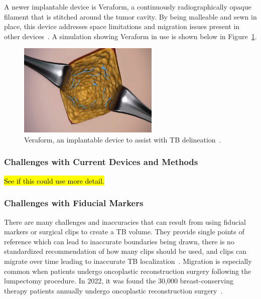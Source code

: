 A newer implantable device is Veraform, a continuously radiographically opaque filament that is stitched around the tumor cavity. By being malleable and sewn in place, this device addresses space limitations and migration issues present in other devices~\cite{RefWorks:RefID:344-mitchell2019adaptable}. A simulation showing Veraform in use is shown below in Figure~\ref{fig:introduction:veraform_implant}.
\begin{figure}[h!]
        \centering
        \includegraphics[width=0.6\textwidth]{../figs/introduction/veraform_implant.png}
        \caption{Veraform, an implantable device to assist with TB delineation~\cite{RefWorks:RefID:344-mitchell2019adaptable}.}
        \label{fig:introduction:veraform_implant}
\end{figure}

\subsubsection{Challenges with Current Devices and Methods\label{sec:introduction:motivation:challengeswithcurrentdevicesandmethods}}
\hl{See if this could use more detail.\\}

\subsubsection*{Challenges with Fiducial Markers\label{sec:introduction:motivation:challengeswithcurrentdevicesandmethods:challengeswithfiducialmarkers}}
There are many challenges and inaccuracies that can result from using fiducial markers or surgical clips to create a TB volume. They provide single points of reference which can lead to inaccurate boundaries being drawn, there is no standardized recommendation of how many clips should be used, and clips can migrate over time leading to inaccurate TB localization~\cite{RefWorks:RefID:344-mitchell2019adaptable}. Migration is especially common when patients undergo oncoplastic reconstruction surgery following the lumpectomy procedure. In 2022, it was found the 30,000 breast-conserving therapy patients annually undergo oncoplastic reconstruction surgery~\cite{RefWorks:RefID:25-acree2022review}.

